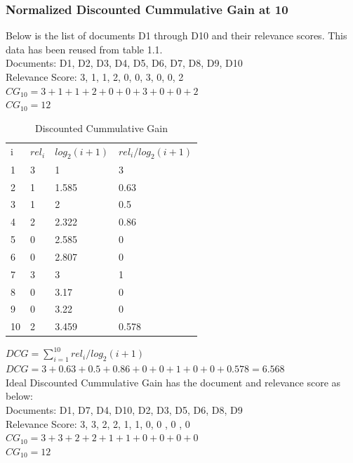 \documentclass[12pt]{report}
\begin{document}
\subsubsection{Normalized Discounted Cummulative Gain at 10}

Below is the list of documents D1 through D10 and their relevance scores. This data has been reused from table 1.1.\\
Documents: D1, D2, D3, D4, D5, D6, D7, D8, D9, D10\\
Relevance Score: 3, 1, 1, 2, 0, 0, 3, 0, 0, 2\\
$CG_{10} = 3+ 1+ 1+ 2+ 0 + 0 + 3 + 0 + 0 + 2$\\
$CG_{10}= 12$ \\
\begin{table}[]
\centering
\caption{Discounted Cummulative Gain}
\label{my-label}
\begin{tabular}{llll}
i & $rel_i$ & $log_2(i + 1)$   & $rel_i / log_2(i + 1)$  \\
1 & 3        & 1     		    & 3    \\
2 & 1        & 1.585 		    & 0.63 \\
3 & 1        & 2     		    & 0.5  \\
4 & 2        & 2.322 		    & 0.86 \\
5 & 0        & 2.585 		    & 0 \\ 
6 & 0        & 2.807     	    & 0    \\
7 & 3        & 3 		    & 1 \\
8 & 0        & 3.17    		    & 0  \\
9 & 0        & 3.22 		    & 0 \\
10 & 2      & 3.459 		    & 0.578 \\ 
\end{tabular}
\end{table}
$DCG = \sum\limits_{i=1}^{10} rel_i / log_2(i + 1)$ \\
$DCG = 3 + 0.63 + 0.5 + 0.86 + 0 + 0 + 1 + 0 + 0 + 0.578 =  6.568$\\
Ideal Discounted Cummulative Gain has the document and relevance score as below:\\
Documents: D1, D7, D4, D10, D2, D3, D5, D6, D8, D9\\
Relevance Score: 3, 3, 2, 2, 1, 1, 0, 0 , 0 , 0 \\
$CG_{10} = 3+ 3 + 2+ 2+ 1+ 1+ 0 + 0 + 0 + 0$\\
$CG_{10} = 12$ \\
\end{document}
